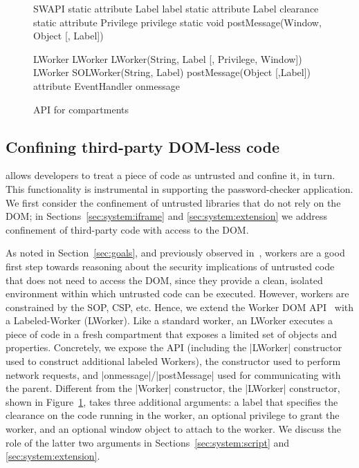 \begin{figure}
{\small
\begin{webidl}
SWAPI {
  static attribute Label label
  static attribute Label clearance 
  static attribute Privilege privilege
  static void postMessage(Window, Object 
                          [, Label])
}
\end{webidl}
\begin{webidl}
LWorker {
  LWorker LWorker(String, Label
                  [, Privilege, Window])
  LWorker SOLWorker(String, Label)
  postMessage(Object [,Label])
  attribute EventHandler onmessage
}
\end{webidl}
}
\vspace{-10pt}
\caption{\label{systemAPI} API for compartments}
\vspace{-10pt}
\end{figure}


\subsection{Confining third-party DOM-less code}
\label{sec:system:worker}

%
%
%
\sys{} allows developers to treat a piece of code as untrusted and
confine it, in turn. This functionality is instrumental in supporting
the password-checker application.
%
We first consider the confinement of untrusted libraries that do not
rely on the DOM; in Sections~\ref{sec:system:iframe} and
\ref{sec:system:extension} we address confinement of third-party code
with access to the DOM.

As noted in Section~\ref{sec:goals}, and previously observed
in~\cite{Ingram:2012}, workers are a good first step towards reasoning
about the security implications of untrusted code that does not need
to access the DOM, since they provide a clean, isolated environment
within which untrusted code can be executed.
%
However, workers are constrained by the SOP, CSP, etc.
%
Hence, we extend the Worker DOM API~\cite{workers} with a
Labeled-Worker (LWorker).
%
Like a standard worker, an LWorker executes a piece of code in a fresh
compartment that exposes a limited set of objects and properties.
%
Concretely, we expose the \sys{} API (including the \js|LWorker|
constructor used to construct additional labeled Workers), the \xhr{}
constructor used to perform network requests, and
\js|onmessage|/\js|postMessage| used for communicating with the
parent.
%
Different from the \js|Worker| constructor, the \js|LWorker|
constructor, shown in Figure~\ref{systemAPI}, takes three additional
arguments: a label that specifies the clearance on the code running in
the worker, an optional privilege to grant the worker, and an optional
window object to attach to the worker.
%
We discuss the role of the latter two arguments in
Sections~\ref{sec:system:script} and \ref{sec:system:extension}.

